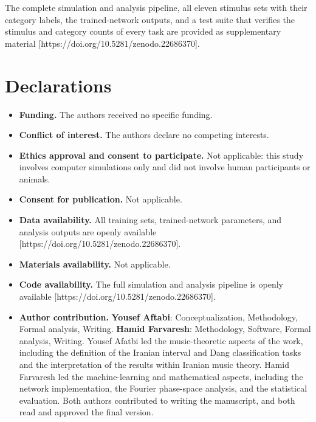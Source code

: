 \documentclass[pdflatex,sn-nature]{sn-jnl}
\newcommand{\ednote}[1]{{\color{red!70!black}\small[\textsf{#1}]}}
\begin{document}
\backmatter


The complete simulation and analysis pipeline, all eleven stimulus sets with their category
labels, the trained-network outputs, and a test suite that verifies the stimulus and
category counts of every task are provided as supplementary material
\ednote{https://doi.org/10.5281/zenodo.22686370}.

\section*{Declarations}

\begin{itemize}
\item \textbf{Funding.} The authors received no specific funding.

\item \textbf{Conflict of interest.} The authors declare no competing interests.

\item \textbf{Ethics approval and consent to participate.} Not applicable: this study
involves computer simulations only and did not involve human participants or animals.

\item \textbf{Consent for publication.} Not applicable.

\item \textbf{Data availability.} All training sets, trained-network parameters, and
analysis outputs are openly available \ednote{https://doi.org/10.5281/zenodo.22686370}.

\item \textbf{Materials availability.} Not applicable.

\item \textbf{Code availability.} The full simulation and analysis pipeline is openly
available \ednote{https://doi.org/10.5281/zenodo.22686370}.

\item \textbf{Author contribution.} \textbf{Yousef Aftabi}: Conceptualization,
Methodology, Formal analysis, Writing. \textbf{Hamid Farvaresh}:
Methodology, Software, Formal analysis, Writing. Yousef Afatbi led
the music-theoretic aspects of the work, including the definition of the Iranian
interval and Dang classification tasks and the interpretation of the results within
Iranian music theory. Hamid Farvaresh led the machine-learning and mathematical aspects,
including the network implementation, the Fourier phase-space analysis, and the
statistical evaluation. Both authors contributed to writing the manuscript, and both
read and approved the final version.
\end{itemize}
\end{document}
